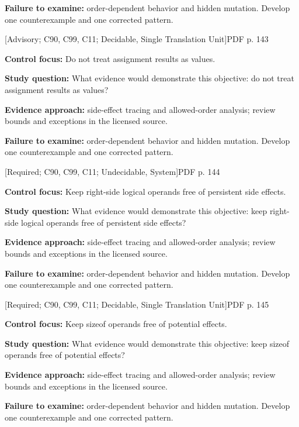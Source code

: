 \documentclass[10pt,letterpaper]{article}
\begin{document}
\textbf{Failure to examine:} order-dependent behavior and hidden mutation. Develop one counterexample and one corrected pattern.\par
\smallskip
{}
 \textsf{\footnotesize [Advisory; C90, C99, C11; Decidable, Single Translation Unit]}\hfill{\footnotesize PDF p. 143}\par
\textbf{Control focus:} Do not treat assignment results as values.\par
\textbf{Study question:} What evidence would demonstrate this objective: do not treat assignment results as values?\par
\textbf{Evidence approach:} side-effect tracing and allowed-order analysis; review bounds and exceptions in the licensed source.\par
\textbf{Failure to examine:} order-dependent behavior and hidden mutation. Develop one counterexample and one corrected pattern.\par
\smallskip
{}
 \textsf{\footnotesize [Required; C90, C99, C11; Undecidable, System]}\hfill{\footnotesize PDF p. 144}\par
\textbf{Control focus:} Keep right-side logical operands free of persistent side effects.\par
\textbf{Study question:} What evidence would demonstrate this objective: keep right-side logical operands free of persistent side effects?\par
\textbf{Evidence approach:} side-effect tracing and allowed-order analysis; review bounds and exceptions in the licensed source.\par
\textbf{Failure to examine:} order-dependent behavior and hidden mutation. Develop one counterexample and one corrected pattern.\par
\smallskip
{}
 \textsf{\footnotesize [Required; C90, C99, C11; Decidable, Single Translation Unit]}\hfill{\footnotesize PDF p. 145}\par
\textbf{Control focus:} Keep sizeof operands free of potential effects.\par
\textbf{Study question:} What evidence would demonstrate this objective: keep sizeof operands free of potential effects?\par
\textbf{Evidence approach:} side-effect tracing and allowed-order analysis; review bounds and exceptions in the licensed source.\par
\textbf{Failure to examine:} order-dependent behavior and hidden mutation. Develop one counterexample and one corrected pattern.\par
\smallskip
\end{document}
